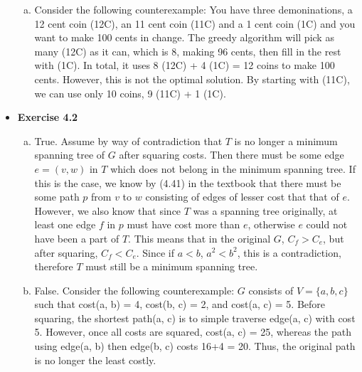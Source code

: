 \documentclass[a4paper]{article}
\begin{document}
\begin{itemize}
\begin{enumerate}[a.]
\item Consider the following counterexample: You have three demoninations, a 12 cent coin (12C), an 11 cent coin (11C) and a 1 cent coin (1C) and you want to make 100 cents in change. The greedy algorithm will pick as many (12C) as it can, which is 8, making 96 cents, then fill in the rest with (1C). In total, it uses 8 (12C) + 4 (1C) = 12 coins to make 100 cents. However, this is not the optimal solution. By starting with (11C), we can use only 10 coins, 9 (11C) + 1 (1C).  \\

\end{enumerate}


\item{\textbf{Exercise 4.2}}
\begin{enumerate}[a.]
\item True. Assume by way of contradiction that $T$ is no longer a minimum spanning tree of $G$ after squaring costs. Then there must be some edge $e = (v, w)$ in $T$ which does not belong in the minimum spanning tree. If this is the case, we know by (4.41) in the textbook that there must be some path $p$ from $v$ to $w$ consisting of edges of lesser cost that that of $e$. However, we also know that since $T$ was a spanning tree originally, at least one edge $f$ in $p$ must have cost more than $e$, otherwise $e$ could not have been a part of $T$. This means that in the original $G$, $C_f > C_e$, but after squaring, $C_f < C_e$. Since if $a < b$, $a^2 < b^2$, this is a contradiction, therefore $T$ must still be a minimum spanning tree.
\item False. Consider the following counterexample: $G$ consists of $V = \{a, b, c\}$ such that cost(a, b) = 4, cost(b, c) = 2, and cost(a, c) = 5. Before squaring, the shortest path(a, c) is to simple traverse edge(a, c) with cost 5. However, once all costs are squared, cost(a, c) = 25, whereas the path using edge(a, b) then edge(b, c) costs 16+4 = 20. Thus, the original path is no longer the least costly. \\
\end{enumerate}



\end{itemize}
\end{document}
